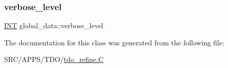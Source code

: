 \mbox{\label{classglobal__data_aed30c4b3aca4044f8f6c77a1b8eec208}} 
\subsubsection{\texorpdfstring{verbose\+\_\+level}{verbose\_level}}
{\footnotesize\ttfamily \mbox{\hyperlink{galois_8h_a09fddde158a3a20bd2dcadb609de11dc}{I\+NT}} global\+\_\+data\+::verbose\+\_\+level}



The documentation for this class was generated from the following file\+:\begin{DoxyCompactItemize}
\item 
S\+R\+C/\+A\+P\+P\+S/\+T\+D\+O/\mbox{\hyperlink{tdo__refine_8_c}{tdo\+\_\+refine.\+C}}\end{DoxyCompactItemize}
